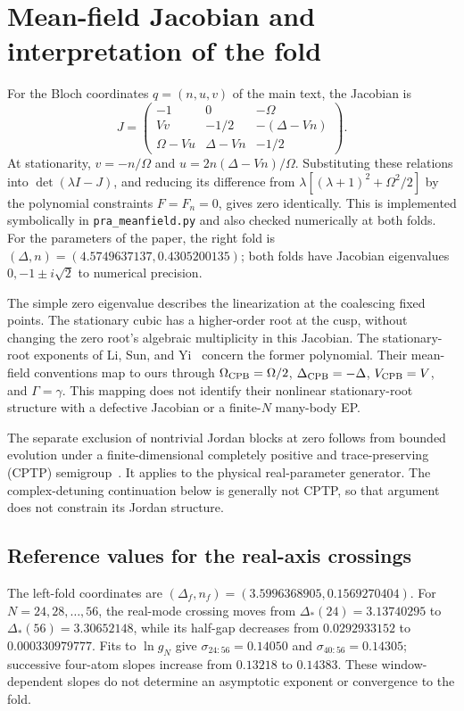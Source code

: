 \documentclass[aps,pra,10pt,onecolumn,superscriptaddress,amsmath,amssymb]{revtex4-2}
\begin{document}
\section{Mean-field Jacobian and interpretation of the fold}
For the Bloch coordinates $q=(n,u,v)$ of the main text, the Jacobian is
\begin{equation}
 J=\begin{pmatrix}
 -1&0&-\Omega\\
 Vv&-1/2&-(\Delta-Vn)\\
 \Omega-Vu&\Delta-Vn&-1/2
 \end{pmatrix}.
\end{equation}
At stationarity, $v=-n/\Omega$ and $u=2n(\Delta-Vn)/\Omega$. Substituting these relations into $\det(\lambda I-J)$, and reducing its difference from $\lambda[(\lambda+1)^2+\Omega^2/2]$ by the polynomial constraints $F=F_n=0$, gives zero identically. This is implemented symbolically in \texttt{pra\_meanfield.py} and also checked numerically at both folds. For the parameters of the paper, the right fold is $(\Delta,n)=(4.5749637137,0.4305200135)$; both folds have Jacobian eigenvalues $0,-1\pm i\sqrt2$ to numerical precision.

The simple zero eigenvalue describes the linearization at the coalescing fixed points. The stationary cubic has a higher-order root at the cusp, without changing the zero root's algebraic multiplicity in this Jacobian. The stationary-root exponents of Li, Sun, and Yi~\cite{LiSunYi2026} concern the former polynomial. Their mean-field conventions map to ours through $\Omega_{\rm CPB}=\Omega/2$, $\Delta_{\rm CPB}=-\Delta$, $V_{\rm CPB}=V$, and $\Gamma=\gamma$. This mapping does not identify their nonlinear stationary-root structure with a defective Jacobian or a finite-$N$ many-body EP.

The separate exclusion of nontrivial Jordan blocks at zero follows from bounded evolution under a finite-dimensional completely positive and trace-preserving (CPTP) semigroup~\cite{AlbertJiang2014}. It applies to the physical real-parameter generator. The complex-detuning continuation below is generally not CPTP, so that argument does not constrain its Jordan structure.

\subsection{Reference values for the real-axis crossings}
The left-fold coordinates are $(\Delta_f,n_f)=(3.5996368905,0.1569270404)$. For $N=24,28,\ldots,56$, the real-mode crossing moves from $\Delta_*(24)=3.13740295$ to $\Delta_*(56)=3.30652148$, while its half-gap decreases from $0.0292933152$ to $0.000330979777$. Fits to $\ln g_N$ give $\sigma_{24:56}=0.14050$ and $\sigma_{40:56}=0.14305$; successive four-atom slopes increase from $0.13218$ to $0.14383$. These window-dependent slopes do not determine an asymptotic exponent or convergence to the fold.
\end{document}
